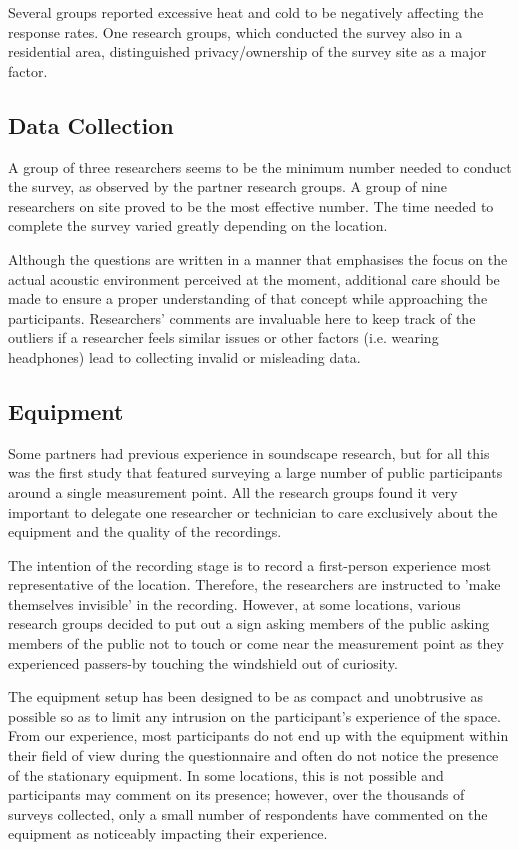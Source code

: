    Several groups reported excessive heat and cold to be negatively affecting the response rates. One research groups, which conducted the survey also in a residential area, distinguished privacy/ownership of the survey site as a major factor.

 \subsection{Data Collection}

   A group of three researchers seems to be the minimum number needed to conduct the survey, as observed by the partner research groups. A group of nine researchers on site proved to be the most effective number. The time needed to complete the survey varied greatly depending on the location.

   Although the questions are written in a manner that emphasises the focus on the actual acoustic environment perceived at the moment, additional care should be made to ensure a proper understanding of that concept while approaching the participants. Researchers' comments are invaluable here to keep track of the outliers if a researcher feels similar issues or other factors (i.e. wearing headphones) lead to collecting invalid or misleading data.

 \subsection{Equipment}

   Some partners had previous experience in soundscape research, but for all this was the first study that featured surveying a large number of public participants around a single measurement point. All the research groups found it very important to delegate one researcher or technician to care exclusively about the equipment and the quality of the recordings.

   The intention of the recording stage is to record a first-person experience most representative of the location. Therefore, the researchers are instructed to 'make themselves invisible' in the recording. However, at some locations, various research groups decided to put out a sign asking members of the public asking members of the public not to touch or come near the measurement point as they experienced passers-by touching the windshield out of curiosity.

   The equipment setup has been designed to be as compact and unobtrusive as possible so as to limit any intrusion on the participant's experience of the space. From our experience, most participants do not end up with the equipment within their field of view during the questionnaire and often do not notice the presence of the stationary equipment. In some locations, this is not possible and participants may comment on its presence; however, over the thousands of surveys collected, only a small number of respondents have commented on the equipment as noticeably impacting their experience.

